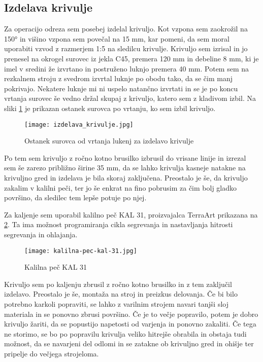 \subsection{Izdelava krivulje}
Za operacijo odreza sem posebej izdelal krivuljo. Kot vzpona
sem zaokrožil na 150° in višino vzpona sem povečal na 15 mm,
kar pomeni, da sem moral uporabiti vzvod z razmerjem 1:5 na
sledilcu krivulje. Krivuljo sem izrisal in jo prenesel na
okrogel surovec iz jekla C45, premera 120 mm in debeline 8 mm, ki je imel
v sredini že izvrtano in postruženo luknjo premera 40 mm.
Potem sem na rezkalnem stroju z svedrom izvrtal luknje po obodu tako,
da se čim manj pokrivajo. Nekatere luknje mi ni uspelo natančno
izvrtati in se je po koncu vrtanja surovec še vedno držal skupaj
z krivuljo, katero sem z kladivom izbil. Na sliki \ref{izdelava_krivulje}
je prikazan ostanek surovca po vrtanju, ko sem izbil krivuljo.

\begin{figure}[H]
	\begin{center}
		\texttt{[image: izdelava\_krivulje.jpg]}
		\caption{Ostanek surovca od vrtanja lukenj za izdelavo krivulje
			\cite{lasten}}
		\label{izdelava_krivulje}
	\end{center}
\end{figure}

Po tem sem krivuljo z ročno kotno brusilko izbrusil do vrisane linije
in izrezal sem še zarezo približno širine 35 mm, da se lahko krivulja
kasneje natakne na krivuljno gred in izdelava je bila skoraj zaključena.
Preostalo je še, da  krivuljo zakalim v kalilni peči, ter jo
še enkrat na fino pobrusim za čim bolj gladko površino,
da sledilec tem lepše potuje po njej.

Za kaljenje sem uporabil kalilno peč KAL 31, proizvajalca TerraArt
prikazana na \ref{kalilna_pec_slika}. Ta ima možnost programiranja
cikla segrevanja in nastavljanja hitrosti segrevanja in ohlajanja.

\begin{figure}[H]
	\begin{center}
		\texttt{[image: kalilna-pec-kal-31.jpg]}
		\caption{Kalilna peč KAL 31
			\cite{kalilna_pec}}
		\label{kalilna_pec_slika}
	\end{center}
\end{figure}

Krivuljo sem po kaljenju zbrusil z ročno kotno brusilko in z tem
zaključil izdelavo. Preostalo je še, montaža na stroj in preizkus
delovanja. Če bi bilo potrebno karkoli popraviti, se lahko z
varilnim strojem navari tanjši sloj materiala in se ponovno zbrusi
površino. Če je to večje popravilo, potem je dobro krivuljo
žariti, da se popustijo napetosti od varjenja in ponovno zakaliti.
Če tega ne storimo, se bo po popravilu krivulja veliko hitrejše
obrabila in obstaja tudi možnost, da se navarjeni del odlomi
in se zatakne ob krivuljno gred in ohišje ter pripelje do večjega
strojeloma.
